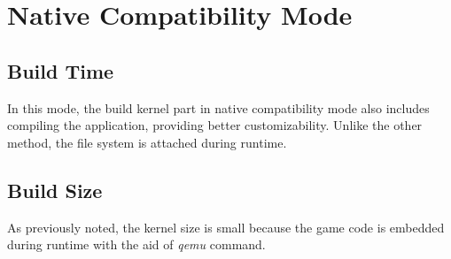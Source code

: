 \section{Native Compatibility Mode}
\subsection{Build Time}
In this mode, the build kernel part in native compatibility mode also includes compiling the application, providing better customizability. Unlike the other method, the file system is attached during runtime.
\\
\subsection{Build Size}
As previously noted, the kernel size is small because the game code is embedded during runtime with the aid of \textit{qemu} command.
